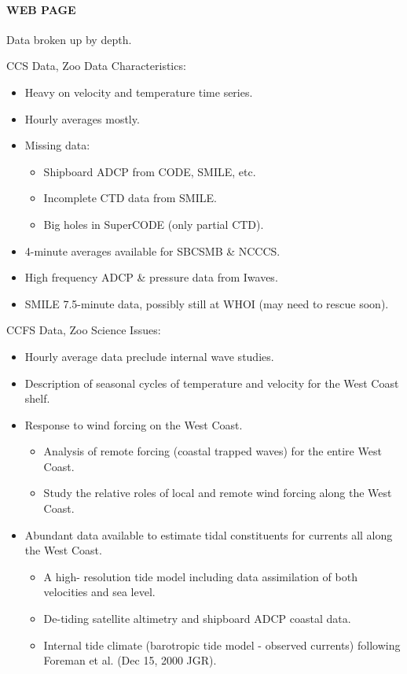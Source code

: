 \paragraph{WEB PAGE}       Data broken up by depth.

CCS Data, Zoo Data Characteristics:
\begin{itemize}
\item Heavy on velocity and temperature time series.
\item Hourly averages mostly. 
\item Missing data:
\begin{itemize}
\item Shipboard ADCP from CODE, SMILE, etc.
\item Incomplete CTD data from SMILE.
\item Big holes in SuperCODE (only partial CTD).
\end{itemize}
\item 4-minute averages available for SBCSMB \& NCCCS.
\item High frequency ADCP \& pressure data from Iwaves.
\item SMILE 7.5-minute data, possibly still at WHOI (may need to rescue soon).
\end{itemize}

CCFS Data, Zoo Science Issues:
\begin{itemize}
\item Hourly average data preclude internal wave studies.
\item Description of seasonal cycles of temperature and velocity for
  the West Coast shelf.
\item Response to wind forcing on the West Coast.
\begin{itemize}
  \item Analysis of remote forcing (coastal trapped waves) for the
  entire West Coast.  
\item Study the relative roles of local and
  remote wind forcing along the West Coast.
\end{itemize}
\item Abundant data available to estimate tidal constituents for
  currents all along the West Coast.  
\begin{itemize}
\item A high- resolution tide
  model including data assimilation of both velocities and sea level.
\item De-tiding satellite altimetry and shipboard ADCP coastal
  data.  
\item Internal tide climate (barotropic tide model -
  observed currents) following Foreman et al. (Dec 15, 2000 JGR).
\end{itemize}
\end{itemize}

